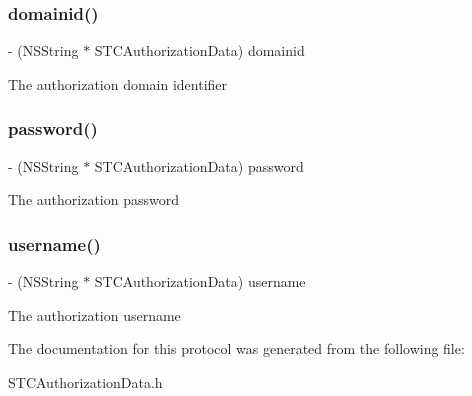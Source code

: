 \subsubsection{\texorpdfstring{domainid()}{domainid()}}
{\footnotesize\ttfamily -\/ (N\+S\+String $\ast$ S\+T\+C\+Authorization\+Data) domainid \begin{DoxyParamCaption}{ }\end{DoxyParamCaption}}

The authorization domain identifier \hypertarget{protocol_s_t_c_authorization_data_01-p_a63e5d838e9bd17abdace07884a121682}{}\label{protocol_s_t_c_authorization_data_01-p_a63e5d838e9bd17abdace07884a121682} 
\subsubsection{\texorpdfstring{password()}{password()}}
{\footnotesize\ttfamily -\/ (N\+S\+String $\ast$ S\+T\+C\+Authorization\+Data) password \begin{DoxyParamCaption}{ }\end{DoxyParamCaption}}

The authorization password \hypertarget{protocol_s_t_c_authorization_data_01-p_a76a855efaf3316cf28942a48a8ca6a64}{}\label{protocol_s_t_c_authorization_data_01-p_a76a855efaf3316cf28942a48a8ca6a64} 
\subsubsection{\texorpdfstring{username()}{username()}}
{\footnotesize\ttfamily -\/ (N\+S\+String $\ast$ S\+T\+C\+Authorization\+Data) username \begin{DoxyParamCaption}{ }\end{DoxyParamCaption}}

The authorization username 

The documentation for this protocol was generated from the following file\+:\begin{DoxyCompactItemize}
\item 
S\+T\+C\+Authorization\+Data.\+h\end{DoxyCompactItemize}

